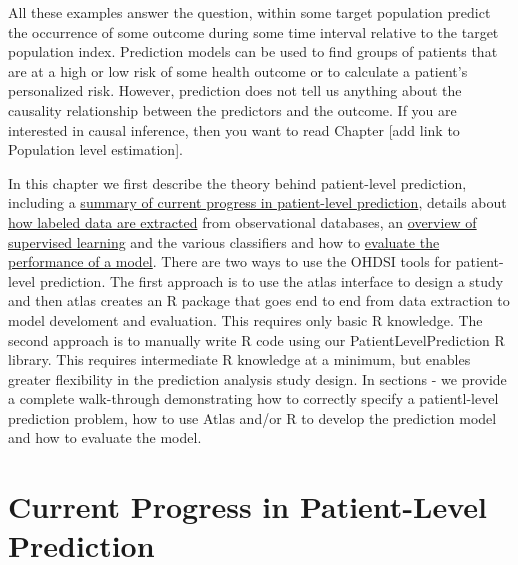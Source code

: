 \documentclass[11pt]{book}
\theoremstyle{definition}
\theoremstyle{definition}
\theoremstyle{definition}
\theoremstyle{remark}
\begin{document}
All these examples answer the question, within some target population predict the occurrence of some outcome during some time interval relative to the target population index. Prediction models can be used to find groups of patients that are at a high or low risk of some health outcome or to calculate a patient's personalized risk. However, prediction does not tell us anything about the causality relationship between the predictors and the outcome. If you are interested in causal inference, then you want to read Chapter {[}add link to Population level estimation{]}.

In this chapter we first describe the theory behind patient-level prediction, including a \protect\hyperlink{progress}{summary of current progress in patient-level prediction}, details about \protect\hyperlink{extracted}{how labeled data are extracted} from observational databases, an \protect\hyperlink{supervised}{overview of supervised learning} and the various classifiers and how to \protect\hyperlink{evaluation}{evaluate the performance of a model}. There are two ways to use the OHDSI tools for patient-level prediction. The first approach is to use the atlas interface to design a study and then atlas creates an R package that goes end to end from data extraction to model develoment and evaluation. This requires only basic R knowledge. The second approach is to manually write R code using our PatientLevelPrediction R library. This requires intermediate R knowledge at a minimum, but enables greater flexibility in the prediction analysis study design. In sections - we provide a complete walk-through demonstrating how to correctly specify a patientl-level prediction problem, how to use Atlas and/or R to develop the prediction model and how to evaluate the model.

\newpage

\hypertarget{progress}{%
\section{Current Progress in Patient-Level Prediction}\label{progress}}
\end{document}

